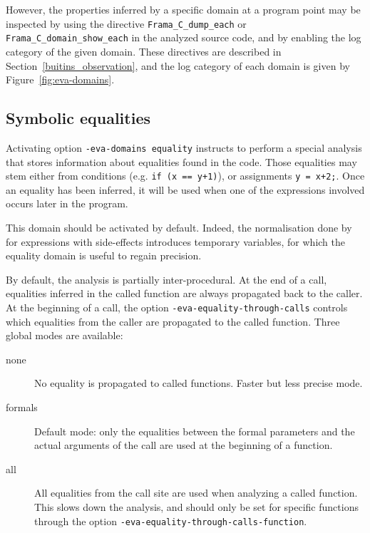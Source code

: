 \documentclass{frama-c-book}
\begin{document}
However, the properties inferred by a specific domain at a program point may be
inspected by using the directive \lstinline+Frama_C_dump_each+ or
\lstinline+Frama_C_domain_show_each+ in the analyzed source code, and by
enabling the log category of the given domain. These directives are described
in Section~\ref{buitins_observation}, and the log category of each domain
is given by Figure~\ref{fig:eva-domains}.

\subsection{Symbolic equalities}
\label{sec:symbolic-equalities}

Activating option \texttt{-eva-domains equality} instructs
\Eva{} to perform a special analysis that stores information
about equalities found in the code. Those equalities may stem either
from conditions (e.g. \texttt{if (x == y+1)}), or assignments
\texttt{y = x+2;}. Once an equality has been inferred, it will
be used when one of the expressions involved occurs later in the program.


\begin{listing-nonumber}
  int y = x+1;
  // the equality y == x + 1 is inferred
  if (y <= 2) {
    // Thanks to the equality, x <= 1 is deduced
  }
}
\end{listing-nonumber}

This domain should be activated by default. Indeed, the normalisation
done by \FramaC for expressions with side-effects introduces temporary
variables, for which the equality domain is useful to regain
precision.

By default, the analysis is partially inter-procedural.
At the end of a call, equalities inferred in the called function are always
propagated back to the caller.
At the beginning of a call, the option \verb+-eva-equality-through-calls+
controls which equalities from the caller are propagated to the called function.
Three global modes are available:
\begin{description}
\item[none] No equality is propagated to called functions. Faster but less
  precise mode.
\item[formals] Default mode: only the equalities between the formal parameters
  and the actual arguments of the call are used at the beginning
  of a function.
\item[all] All equalities from the call site are used when analyzing a called
  function.  This slows down the analysis, and should only be set for specific
  functions through the option \verb+-eva-equality-through-calls-function+.
\end{description}
\end{document}
